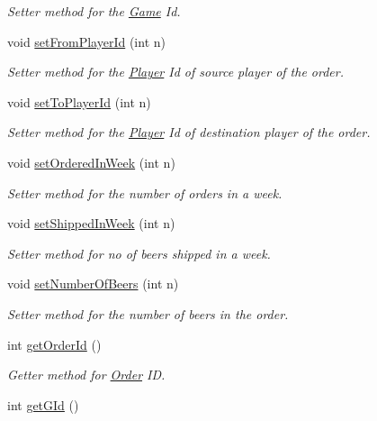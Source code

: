 \begin{DoxyCompactItemize}
\begin{DoxyCompactList}\small\item\em Setter method for the \hyperlink{class_game}{Game} Id. \end{DoxyCompactList}\item 
void \hyperlink{class_order_a8a41cdea30959709f9c9dbdadd4f62f0}{set\+From\+Player\+Id} (int n)
\begin{DoxyCompactList}\small\item\em Setter method for the \hyperlink{class_player}{Player} Id of source player of the order. \end{DoxyCompactList}\item 
void \hyperlink{class_order_aea921d19a1a5451eccc92b457c952fba}{set\+To\+Player\+Id} (int n)
\begin{DoxyCompactList}\small\item\em Setter method for the \hyperlink{class_player}{Player} Id of destination player of the order. \end{DoxyCompactList}\item 
void \hyperlink{class_order_aba9a5987294110e6f6dea45feb88c31a}{set\+Ordered\+In\+Week} (int n)
\begin{DoxyCompactList}\small\item\em Setter method for the number of orders in a week. \end{DoxyCompactList}\item 
void \hyperlink{class_order_aac9de21348f84e2556101d52c0ec53af}{set\+Shipped\+In\+Week} (int n)
\begin{DoxyCompactList}\small\item\em Setter method for no of beers shipped in a week. \end{DoxyCompactList}\item 
void \hyperlink{class_order_a5df5676cf7fc84374b5bdb5789aaf2f5}{set\+Number\+Of\+Beers} (int n)
\begin{DoxyCompactList}\small\item\em Setter method for the number of beers in the order. \end{DoxyCompactList}\item 
int \hyperlink{class_order_aa5042da754f07b1876aa63615c5f2983}{get\+Order\+Id} ()
\begin{DoxyCompactList}\small\item\em Getter method for \hyperlink{class_order}{Order} ID. \end{DoxyCompactList}\item 
int \hyperlink{class_order_a89b55df1654ff4cb9db6608fc88c86ed}{get\+G\+Id} ()

\end{DoxyCompactItemize}
